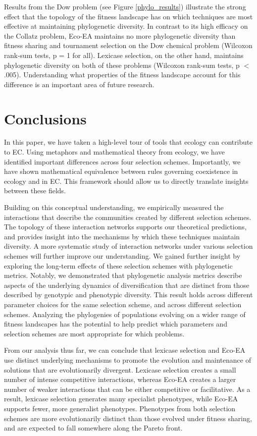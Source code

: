 Results from the Dow problem (see Figure \ref{phylo_results}) illustrate the strong effect that the topology of the fitness landscape has on which techniques are most effective at maintaining phylogenetic diversity. In contrast to its high efficacy on the Collatz problem, Eco-EA maintains no more phylogenetic diversity than fitness sharing and tournament selection on the Dow chemical problem (Wilcoxon rank-sum tests, p = 1 for all). Lexicase selection, on the other hand, maintains phylogenetic diversity on both of these problems (Wilcoxon rank-sum tests, p $<$ .005). Understanding what properties of the fitness landscape account for this difference is an important area of future research.

\section{Conclusions}

In this paper, we have taken a high-level tour of tools that ecology can contribute to EC. Using metaphors and mathematical theory from ecology, we have identified
important differences across four selection schemes. Importantly, we have shown mathematical equivalence between rules governing coexistence in ecology and in EC. This framework should allow us to directly translate insights between these fields.

Building on this conceptual understanding, we empirically measured the interactions that describe the communities created by different selection schemes. The topology of these interaction networks supports our theoretical predictions, and provides insight into the mechanisms by which these techniques maintain diversity. A more systematic study of interaction networks under various selection schemes will further improve our understanding. We gained further insight by exploring the long-term effects of these selection schemes with phylogenetic metrics. Notably, we demonstrated that phylogenetic analysis metrics describe aspects of the underlying dynamics of diversification that are distinct from those described by genotypic and phenotypic diversity. This result holds across different parameter choices for the same selection scheme, and across different selection schemes. Analyzing the phylogenies of populations evolving on a wider range of fitness landscapes has the potential to help predict which parameters and selection schemes are most appropriate for which problems.

From our analysis thus far, we can conclude that lexicase selection and Eco-EA use distinct underlying mechanisms to promote the evolution and maintenance of solutions that are evolutionarily divergent. Lexicase selection creates a small number of intense competitive interactions, whereas Eco-EA creates a larger number of weaker interactions that can be either competitive or facilitative. As a result, lexicase selection generates %
many specialist phenotypes, while Eco-EA supports
fewer, more generalist phenotypes. Phenotypes from both selection schemes are more evolutionarily distinct than those evolved under fitness sharing, and are expected to fall somewhere along the Pareto front.

